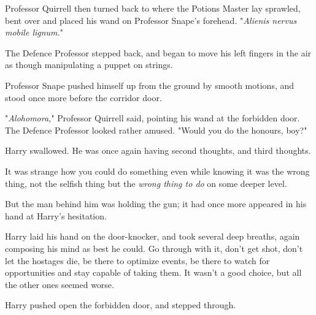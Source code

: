 Professor Quirrell then turned back to where the Potions Master lay sprawled,
bent over and placed his wand on Professor Snape's forehead. "\emph{Alienis
nervus mobile lignum.}"

The Defence Professor stepped back, and began to move his left fingers in the
air as though manipulating a puppet on strings.

Professor Snape pushed himself up from the ground by smooth motions, and stood
once more before the corridor door.

"\emph{Alohomora,}" Professor Quirrell said, pointing his wand at the forbidden
door. The Defence Professor looked rather amused. "Would you do the honours,
boy?"

Harry swallowed. He was once again having second thoughts, and third thoughts.

It was strange how you could do something even while knowing it was the wrong
thing, not the selfish thing but the \emph{wrong thing to do} on some deeper
level.

But the man behind him was holding the gun; it had once more appeared in his
hand at Harry's hesitation.

Harry laid his hand on the door-knocker, and took several deep breaths, again
composing his mind as best he could. Go through with it, don't get shot, don't
let the hostages die, be there to optimize events, be there to watch for
opportunities and stay capable of taking them. It wasn't a good choice, but all
the other ones seemed worse.

Harry pushed open the forbidden door, and stepped through.
